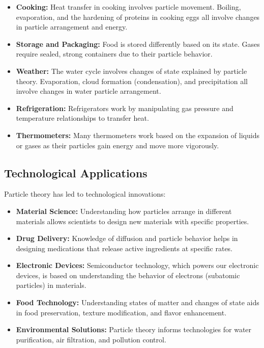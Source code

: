 \begin{itemize}
    \item \textbf{Cooking:} Heat transfer in cooking involves particle movement. Boiling, evaporation, and the hardening of proteins in cooking eggs all involve changes in particle arrangement and energy.
    
    \item \textbf{Storage and Packaging:} Food is stored differently based on its state. Gases require sealed, strong containers due to their particle behavior.
    
    \item \textbf{Weather:} The water cycle involves changes of state explained by particle theory. Evaporation, cloud formation (condensation), and precipitation all involve changes in water particle arrangement.
    
    \item \textbf{Refrigeration:} Refrigerators work by manipulating gas pressure and temperature relationships to transfer heat.
    
    \item \textbf{Thermometers:} Many thermometers work based on the expansion of liquids or gases as their particles gain energy and move more vigorously.
\end{itemize}

\subsection{Technological Applications}

Particle theory has led to technological innovations:

\begin{itemize}
    \item \textbf{Material Science:} Understanding how particles arrange in different materials allows scientists to design new materials with specific properties.
    
    \item \textbf{Drug Delivery:} Knowledge of diffusion and particle behavior helps in designing medications that release active ingredients at specific rates.
    
    \item \textbf{Electronic Devices:} Semiconductor technology, which powers our electronic devices, is based on understanding the behavior of electrons (subatomic particles) in materials.
    
    \item \textbf{Food Technology:} Understanding states of matter and changes of state aids in food preservation, texture modification, and flavor enhancement.
    
    \item \textbf{Environmental Solutions:} Particle theory informs technologies for water purification, air filtration, and pollution control.
\end{itemize}

